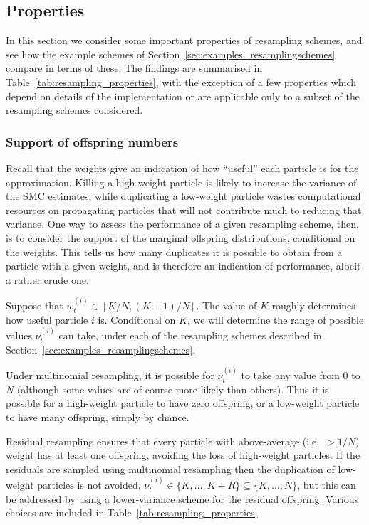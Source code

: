 \subsection{Properties}\label{sec:resampling_properties}
In this section we consider some important properties of resampling schemes, and see how the example schemes of Section~\ref{sec:examples_resamplingschemes} compare in terms of these.
The findings are summarised in Table~\ref{tab:resampling_properties}, with the exception of a few properties which depend on details of the implementation or are applicable only to a subset of the resampling schemes considered.


\subsubsection{Support of offspring numbers}
Recall that the weights give an indication of how ``useful'' each particle is for the approximation. Killing a high-weight particle is likely to increase the variance of the SMC estimates, while duplicating a low-weight particle wastes computational resources on propagating particles that will not contribute much to reducing that variance.
One way to assess the performance of a given resampling scheme, then, is to consider the support of the marginal offspring distributions, conditional on the weights. This tells us how many duplicates it is possible to obtain from a particle with a given weight, and is therefore an indication of performance, albeit a rather crude one.

Suppose that $w_t^{(i)} \in [K/N, (K+1)/N]$. The value of $K$ roughly determines how useful particle $i$ is. Conditional on $K$, we will determine the range of possible values $\nu_t^{(i)}$ can take, under each  of the resampling schemes described in Section~\ref{sec:examples_resamplingschemes}.

Under multinomial resampling, it is possible for $\nu_t^{(i)}$ to take any value from $0$ to $N$ (although some values are of course more likely than others).
Thus it is possible for a high-weight particle to have zero offspring, or a low-weight particle to have many offspring, simply by chance.

Residual resampling ensures that every particle with above-average (i.e.\ $>1/N$) weight has at least one offspring, avoiding the loss of high-weight particles. If the residuals are sampled using multinomial resampling then the duplication of low-weight particles is not avoided, $\nu_t^{(i)} \in \{K, \dots, K+R\} \subseteq \{K,\dots, N\}$, but this can be addressed by using a lower-variance scheme for the residual offspring. Various choices are included in Table~\ref{tab:resampling_properties}.

